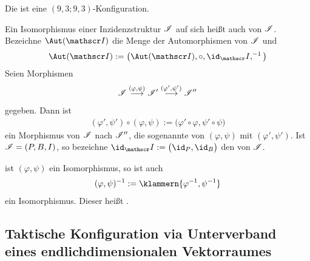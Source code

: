 \begin{beispiel}\enter
	Die  ist eine $(9,3;9,3)$-Konfiguration.
\end{beispiel}

\begin{definition}
	Ein Isomorphismus einer Inzidenzstruktur $\mathscr{I}$ auf sich heißt auch  von $\mathscr{I}$.
	Bezeichne $\Aut(\Inz)$ die Menge der Automorphismen von $\mathscr{I}$ und
	\begin{align*}
		\Aut(\Inz):=\big(\Aut(\Inz),\circ,\id_\Inz,^{-1}\big)
	\end{align*}
	Seien Morphismen
	\begin{align*}
		\mathscr{I}\overset{(\varphi,\psi)}{\longrightarrow}\mathscr{I}'\overset{(\varphi',\psi')}{\longrightarrow}\mathscr{I}''
	\end{align*}		
	gegeben. Dann ist
	\begin{align*}
		(\varphi',\psi')\circ(\varphi,\psi):=\big(\varphi'\circ\varphi,\psi'\circ\psi\big)
	\end{align*}
	ein Morphismus von $\mathscr{I}$ nach $\mathscr{I}''$, die sogenannte   von $(\varphi,\psi)$ mit $(\varphi',\psi')$.
	\nl
	Ist $\mathscr{I}=(P,B,I)$, so bezeichne $\id_\Inz:=\big(\id_P,\id_B\big)$ den  von $\mathscr{I}$.
\end{definition}

\begin{lemma}
	ist $(\varphi,\psi)$ ein Isomorphismus, so ist auch 
	\begin{align*}
		(\varphi,\psi)^{-1}:=\klammern{\varphi^{-1},\psi^{-1}}
	\end{align*}
	ein Isomorphismus.
	Dieser heißt .
\end{lemma}

\subsection{Taktische Konfiguration via Unterverband eines endlichdimensionalen Vektorraumes}

